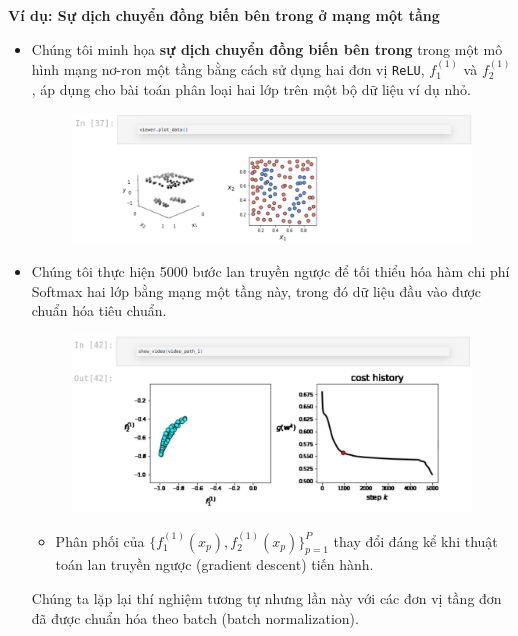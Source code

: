 \documentclass{book}
\begin{document}
    \textbf{Ví dụ: Sự dịch chuyển đồng biến bên trong ở mạng một tầng}
    \begin{itemize}
        \item Chúng tôi minh họa \textbf{sự dịch chuyển đồng biến bên trong} trong một mô hình mạng nơ-ron một tầng bằng cách sử dụng hai đơn vị \texttt{ReLU}, $f^{(1)}_1$ và $f^{(1)}_2$, áp dụng cho bài toán phân loại hai lớp trên một bộ dữ liệu ví dụ nhỏ.
        \begin{figure}[H]
            \centering
            \includegraphics[width=1.0\linewidth]{images/single.png}
            \label{fig:single}
        \end{figure}
        \item Chúng tôi thực hiện 5000 bước lan truyền ngược để tối thiểu hóa hàm chi phí Softmax hai lớp bằng mạng một tầng này, trong đó dữ liệu đầu vào được chuẩn hóa tiêu chuẩn.
    \begin{figure}[H]
        \centering
        \includegraphics[width=1.0\linewidth]{images/video1.png}
        \label{fig:video1}
    \end{figure}
    \begin{itemize}
    \item Phân phối của $\{f^{(1)}_1(x_{p}), f^{(1)}_2(x_{p})\}_{p=1}^{P}$ thay đổi đáng kể khi thuật toán lan truyền ngược (gradient descent) tiến hành.
    \end{itemize}
    Chúng ta lặp lại thí nghiệm tương tự nhưng lần này với các đơn vị tầng đơn đã được chuẩn hóa theo batch (batch normalization).

\end{itemize}
\end{document}
